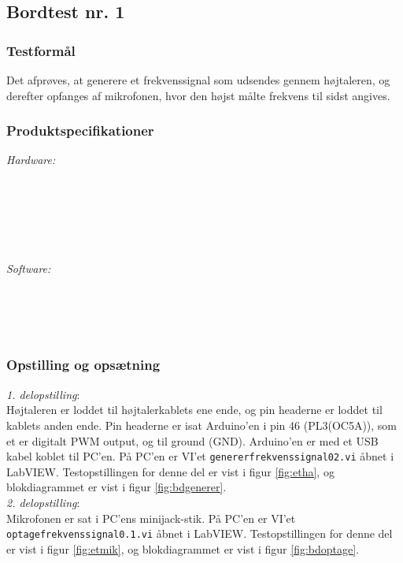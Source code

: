 	\subsection{Bordtest nr. 1} %
	\label{bordtest1}
		\subsubsection{Testformål}
		Det afprøves, at generere et frekvenssignal som udsendes gennem højtaleren, og derefter opfanges af mikrofonen, hvor den højst målte frekvens til sidst angives.  
		\subsubsection{Produktspecifikationer}
		
		\textit{Hardware:}\\
		\\
		\hojtalerkabel\\
		\pins\\
		\arduino\\
		\PC\\
		\usbkabel\\
	
		\textit{Software:}\\
		\labview\\
		\visa\\
		\vi\\
		\ardsw\
		
		\subsubsection{Opstilling og opsætning}
		\textit{1. delopstilling}:\\
		Højtaleren er loddet til højtalerkablets ene ende, og pin headerne er loddet til kablets anden ende. 
		Pin headerne er isat Arduino'en i pin 46 (PL3(OC5A)), som et er digitalt PWM output, og til ground (GND). 
		Arduino'en er med et USB kabel koblet til PC'en. 		
		På PC'en er VI'et \texttt{genererfrekvenssignal02.vi} åbnet i LabVIEW. Testopstillingen for denne del er vist i figur \ref{fig:etha}, og blokdiagrammet er vist i figur \ref{fig:bdgenerer}.\\ 
 
		\textit{2. delopstilling}:\\
		Mikrofonen er sat i PC'ens minijack-stik. På PC'en er VI'et \texttt{optagefrekvenssignal0.1.vi} åbnet i LabVIEW. Testopstillingen for denne del er vist i figur \ref{fig:etmik}, og blokdiagrammet er vist i figur \ref{fig:bdoptage}.\\ 
		
